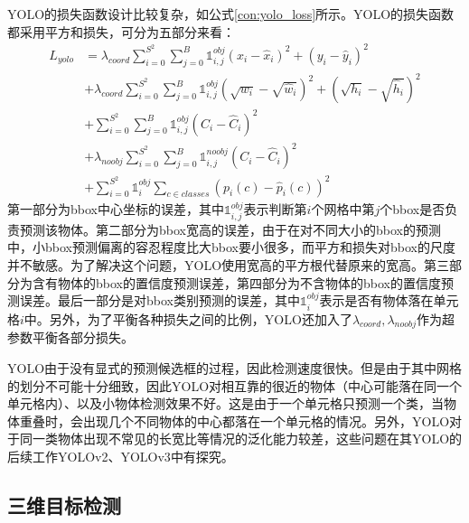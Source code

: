 YOLO的损失函数设计比较复杂，如公式\ref{con:yolo_loss}所示。YOLO的损失函数都采用平方和损失，可分为五部分来看：
\begin{equation}
\begin{split}
L_{yolo} &= \lambda_{coord} \sum^{S^2}_{i=0} \sum^{B}_{j=0} \mathds{1}^{obj}_{i,j} (x_i - \hat{x}_i)^2 + (y_i - \hat{y}_i)^2 \\
&+ \lambda_{coord} \sum^{S^2}_{i=0} \sum^{B}_{j=0} \mathds{1}^{obj}_{i,j} \left(\sqrt{w_i} - \sqrt{\hat{w}_i}\right)^2 + \left(\sqrt{h_i} - \sqrt{\hat{h}_i}\right)^2 \\
&+ \sum^{S^2}_{i=0} \sum^{B}_{j=0} \mathds{1}^{obj}_{i,j}\left(C_i -\hat{C}_i\right)^2\\
&+ \lambda_{noobj} \sum^{S^2}_{i=0} \sum^{B}_{j=0} \mathds{1}^{noobj}_{i,j}\left(C_i -\hat{C}_i\right)^2\\
&+ \sum^{S^2}_{i=0}\mathds{1}^{obj}_{i}\sum_{c \in classes} \left(p_i(c) - \hat{p}_i(c)\right)^2
\end{split}
\label{con:yolo_loss}
\end{equation}
第一部分为bbox中心坐标的误差，其中$\mathds{1}^{obj}_{i,j}$表示判断第$i$个网格中第$j$个bbox是否负责预测该物体。第二部分为bbox宽高的误差，由于在对不同大小的bbox的预测中，小bbox预测偏离的容忍程度比大bbox要小很多，而平方和损失对bbox的尺度并不敏感。为了解决这个问题，YOLO使用宽高的平方根代替原来的宽高。第三部分为含有物体的bbox的置信度预测误差，第四部分为不含物体的bbox的置信度预测误差。最后一部分是对bbox类别预测的误差，其中$\mathds{1}^{obj}_{i}$表示是否有物体落在单元格$i$中。另外，为了平衡各种损失之间的比例，YOLO还加入了$\lambda_{coord}, \lambda_{noobj}$作为超参数平衡各部分损失。

YOLO由于没有显式的预测候选框的过程，因此检测速度很快。但是由于其中网格的划分不可能十分细致，因此YOLO对相互靠的很近的物体（中心可能落在同一个单元格内）、以及小物体检测效果不好。这是由于一个单元格只预测一个类，当物体重叠时，会出现几个不同物体的中心都落在一个单元格的情况。另外，YOLO对于同一类物体出现不常见的长宽比等情况的泛化能力较差，这些问题在其YOLO的后续工作YOLOv2\cite{8100173}、YOLOv3\cite{RedmonYOLOv3}中有探究。

\subsection{三维目标检测}
\label{3d_detection}



